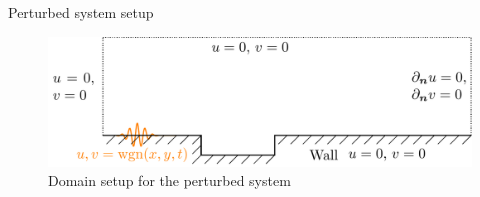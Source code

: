 \documentclass[aspectratio=43, xcolor=table]{beamer}
\begin{document}
\begin{frame}{Perturbed system setup}

	\begin{figure}[ht]
		\centering
		\includegraphics[width=\textwidth]{../../Images/domainPert.pdf}
		\caption{Domain setup for the perturbed system}
	\end{figure}

\end{frame}
\end{document}
